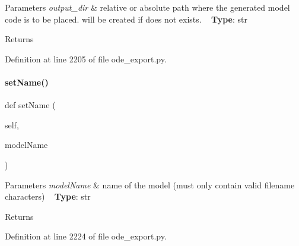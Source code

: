 \begin{DoxyParams}{Parameters}
{\em output\+\_\+dir} & relative or absolute path where the generated model code is to be placed. will be created if does not exists. ~\newline
{\bfseries Type}\+: str\\
\hline
\end{DoxyParams}
\begin{DoxyReturn}{Returns}

\end{DoxyReturn}


Definition at line 2205 of file ode\+\_\+export.\+py.

\mbox{\label{classamici_1_1ode__export_1_1_o_d_e_exporter_af9ec4a20beb62b41663733ecfc8e1713}} 
\paragraph{\texorpdfstring{set\+Name()}{setName()}}
{\footnotesize\ttfamily def set\+Name (\begin{DoxyParamCaption}\item[{}]{self,  }\item[{}]{model\+Name }\end{DoxyParamCaption})}


\begin{DoxyParams}{Parameters}
{\em model\+Name} & name of the model (must only contain valid filename characters) ~\newline
{\bfseries Type}\+: str\\
\hline
\end{DoxyParams}
\begin{DoxyReturn}{Returns}

\end{DoxyReturn}


Definition at line 2224 of file ode\+\_\+export.\+py.

